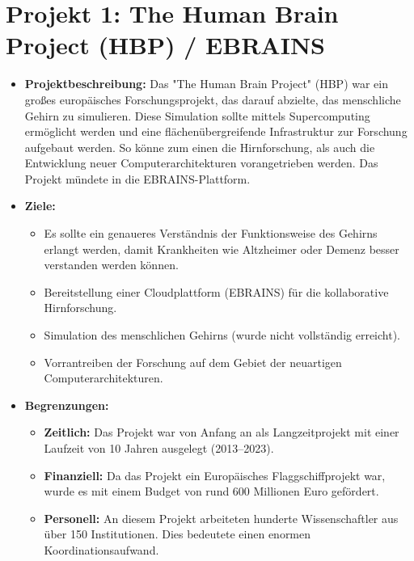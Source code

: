 \documentclass{article}
\begin{document}
\section{Projekt 1: The Human Brain Project (HBP) / EBRAINS}
\begin{itemize}
    \item \textbf{Projektbeschreibung:} 
    Das "The Human Brain Project" (HBP) war ein großes europäisches Forschungsprojekt, das darauf abzielte, 
    das menschliche Gehirn zu simulieren. Diese Simulation sollte mittels Supercomputing ermöglicht 
    werden und eine flächenübergreifende Infrastruktur zur Forschung aufgebaut werden. 
    So könne zum einen die Hirnforschung, als auch die Entwicklung neuer Computerarchitekturen 
    vorangetrieben werden. Das Projekt mündete in die EBRAINS-Plattform.

    \item \textbf{Ziele:}
    \begin{itemize}
        \item Es sollte ein genaueres Verständnis der Funktionsweise des Gehirns erlangt 
        werden, damit Krankheiten wie Altzheimer oder Demenz besser verstanden werden können.
        \item Bereitstellung einer Cloudplattform (EBRAINS) für die kollaborative 
        Hirnforschung.
        \item Simulation des menschlichen Gehirns (wurde nicht vollständig erreicht).
        \item Vorrantreiben der Forschung auf dem Gebiet der neuartigen Computerarchitekturen.
    \end{itemize}

    \item \textbf{Begrenzungen:}
    \begin{itemize}
        \item \textbf{Zeitlich:} Das Projekt war von Anfang an als Langzeitprojekt mit einer Laufzeit von 10 Jahren ausgelegt (2013–2023).
        \item \textbf{Finanziell:} Da das Projekt ein Europäisches Flaggschiffprojekt war, wurde es mit einem Budget von rund 600 Millionen Euro gefördert.
        \item \textbf{Personell:} An diesem Projekt arbeiteten hunderte Wissenschaftler aus über 150 Institutionen. Dies bedeutete einen enormen Koordinationsaufwand.
    \end{itemize}


\end{itemize}
\end{document}
